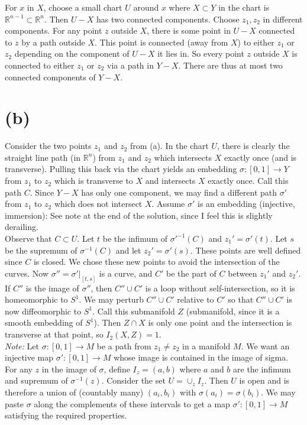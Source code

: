 \documentclass{amsbook}
\theoremstyle{theorem}
\theoremstyle{plain}
\theoremstyle{remark}
\newcommand{\R}{\mathbb R}
\begin{document}
For $x$ in $X$, choose a small chart $U$ around $x$ where $X\subset Y$ in the chart is $\R^{n-1}\subset \R^n$. Then $U-X$ has two connected components. Choose $z_1, z_2$ in different components. For any point $z$ outside $X$, there is some point in $U-X$ connected to $z$ by a path outside $X$. This point is connected (away from $X$) to either $z_1$ or $z_2$ depending on the component of $U-X$ it lies in. So every point $z$ outside $X$ is connected to either $z_1$ or $z_2$ via a path in $Y - X$. There are thus at most two connected components of $Y-X$.

\section*{(b)}

Consider the two points $z_1$ and $z_2$ from (a). In the chart $U$, there is clearly the straight line path (in $\R^n$) from $z_1$ and $z_2$ which intersects $X$ exactly once (and is transverse). Pulling this back via the chart yields an embedding $\sigma:[0,1] \to Y$ from $z_1$ to $z_2$ which is transverse to $X$ and intersects $X$ exactly once. Call this path $C$. Since $Y-X$ has only one component, we may find a different path $\sigma'$ from $z_1$ to $z_2$ which does not intersect $X$. Assume $\sigma'$ is an embedding (injective, immersion): See note at the end of the solution, since I feel this is slightly derailing. \\

Observe that $C\subset U$. Let $t$ be the infimum of $\sigma'^{-1}(C)$ and $z_1' = \sigma'(t)$. Let $s$ be the supremum of $\sigma^{-1}(C)$ and let $z_2' = \sigma'(s)$. These points are well defined since $C$ is closed. We chose these new points to avoid the intersection of the curves. Now $\sigma'' = \sigma'|_{[t,s]}$ is a curve, and $C'$ be the part of $C$ between $z_1'$ and $z_2'$. If $C''$ is the image of $\sigma''$, then $C'' \cup C'$ is a loop without self-intersection, so it is homeomorphic to $S^1$. We may perturb $C''\cup C'$  relative to $C'$ so that $C'' \cup C'$ is now diffeomorphic to $S^1$. Call this submanifold $Z$ (submanifold, since it is a smooth embedding of $S^1$). Then $Z\cap X$ is only one point and the intersection is transverse at that point, so $I_2(X,Z) = 1$.\\

\textit{Note:} Let $\sigma:[0,1]\to M$ be a path from $z_1\neq z_2$ in a manifold $M$. We want an injective map $\sigma':[0,1] \to M$ whose image is contained in the image of sigma. For any $z$ in the image of $\sigma$, define $I_z = (a,b)$ where $a$ and $b$ are the infimum and supremum of $\sigma^{-1}(z)$. Consider the set $U = \cup_z I_z$. Then $U$ is open and is therefore a union of (countably many) $(a_i,b_i)$ with $\sigma(a_i) = \sigma(b_i)$. We may paste $\sigma$ along the complements of these intervals to get a map $\sigma': [0,1] \to M$ satisfying the required properties.
\end{document}
